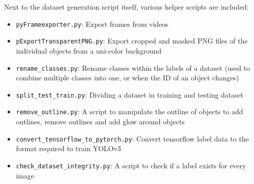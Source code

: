 Next to the dataset generation script itself, various helper scripts are included:
\begin{itemize}
\item \texttt{pyFrameexporter.py}: Export frames from videos
\item \texttt{pExportTransparentPNG.py}: Export cropped and masked PNG files of the individual objects from a uni-color background
\item \texttt{rename\_classes.py}: Rename classes within the labels of a dataset (used to combine multiple classes into one, or when the ID of an object changes)
\item \texttt{split\_test\_train.py}: Dividing a dataset in training and testing dataset
\item \texttt{remove\_outline.py}: A script to manipulate the outline of objects to add outlines, remove outlines and add glow around objects
\item \texttt{convert\_tensorflow\_to\_pytorch.py}: Convert tensorflow label data to the format required to train YOLOv3
\item \texttt{check\_dataset\_integrity.py}: A script to check if a label exists for every image
\end{itemize}

